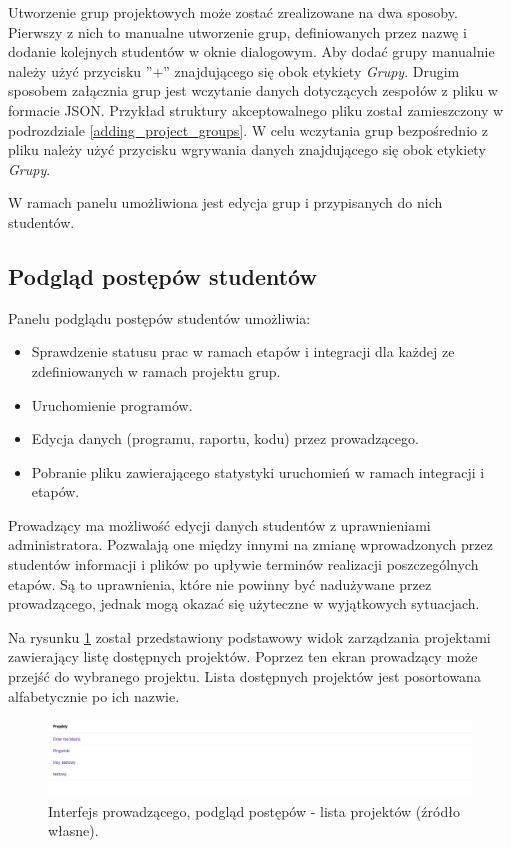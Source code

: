 Utworzenie grup projektowych może zostać zrealizowane na dwa sposoby.
Pierwszy z nich to manualne utworzenie grup, definiowanych przez nazwę i dodanie kolejnych studentów w oknie dialogowym.
Aby dodać grupy manualnie należy użyć przycisku ”+” znajdującego się obok etykiety \textit{Grupy}.
Drugim sposobem załącznia grup jest wczytanie danych dotyczących zespołów z pliku w formacie JSON.
Przykład struktury akceptowalnego pliku został zamieszczony w podrozdziale \ref{adding_project_groups}.
W celu wczytania grup bezpośrednio z pliku należy użyć przycisku wgrywania danych znajdującego się obok etykiety \textit{Grupy}.

W ramach panelu umożliwiona jest edycja grup i przypisanych do nich studentów.

\subsection{Podgląd postępów studentów}
\label{lecturer_preview}

Panelu podglądu postępów studentów umożliwia:
\begin {itemize}
    \item Sprawdzenie statusu prac w ramach etapów i integracji dla każdej ze zdefiniowanych w ramach projektu grup.
    \item Uruchomienie programów.
    \item Edycja danych (programu, raportu, kodu) przez prowadzącego.
    \item Pobranie pliku zawierającego statystyki uruchomień w ramach integracji i etapów.
\end {itemize}

Prowadzący ma możliwość edycji danych studentów z uprawnieniami administratora.
Pozwalają one między innymi na zmianę wprowadzonych przez studentów informacji i plików po upływie terminów realizacji poszczególnych etapów.
Są to uprawnienia, które nie powinny być nadużywane przez prowadzącego, jednak mogą okazać się użyteczne w wyjątkowych sytuacjach.

Na rysunku \ref{fig:lecturer_preview_projects_list} został przedstawiony podstawowy widok zarządzania projektami zawierający listę dostępnych projektów.
Poprzez ten ekran prowadzący może przejść do wybranego projektu.
Lista dostępnych projektów jest posortowana alfabetycznie po ich nazwie.

\begin{figure}[h]
    \centering
    \includegraphics[width = 13cm]{chapter04/lecturer_preview_projects_list.png}
    \caption{Interfejs prowadzącego, podgląd postępów - lista projektów (źródło własne).}
    \label{fig:lecturer_preview_projects_list}
\end{figure}

